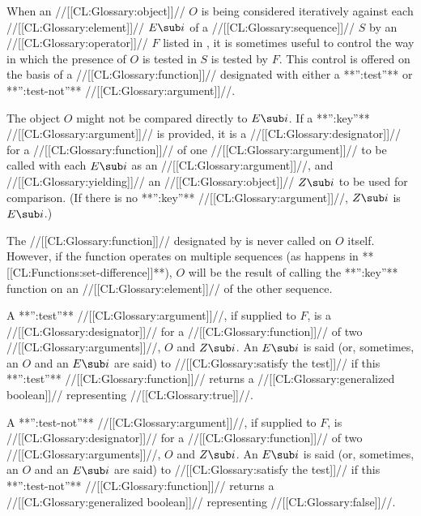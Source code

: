 

 

When an //[[CL:Glossary:object]]// $O$ is being considered iteratively  against each //[[CL:Glossary:element]]// $E\sub i$ of a //[[CL:Glossary:sequence]]// $S$ by an //[[CL:Glossary:operator]]// $F$ listed in \thenextfigure, it is sometimes useful to control the way in which the presence of $O$  is tested in $S$ is tested by $F$. This control is offered on the basis of a //[[CL:Glossary:function]]// designated with  either a **'':test''** or **'':test-not''** //[[CL:Glossary:argument]]//.


The object $O$ might not be compared directly to $E\sub i$. If a **'':key''** //[[CL:Glossary:argument]]// is provided, it is a //[[CL:Glossary:designator]]// for a //[[CL:Glossary:function]]// of one //[[CL:Glossary:argument]]//  to be called with each $E\sub i$ as an //[[CL:Glossary:argument]]//,  and //[[CL:Glossary:yielding]]// an //[[CL:Glossary:object]]// $Z\sub i$ to be used for comparison. (If there is no **'':key''** //[[CL:Glossary:argument]]//, $Z\sub i$ is $E\sub i$.)

The //[[CL:Glossary:function]]// designated by  is never called on $O$ itself. However, if the function operates on multiple sequences (\eg as happens in **[[CL:Functions:set-difference]]**), $O$ will be the result of calling the **'':key''** function on an //[[CL:Glossary:element]]// of the other sequence.  

A **'':test''** //[[CL:Glossary:argument]]//, if supplied to $F$, is a //[[CL:Glossary:designator]]// for a  //[[CL:Glossary:function]]// of two //[[CL:Glossary:arguments]]//, $O$ and $Z\sub i$. An $E\sub i$ is said (or, sometimes, an $O$ and an $E\sub i$ are said) to //[[CL:Glossary:satisfy the test]]//  if this **'':test''** //[[CL:Glossary:function]]// returns a //[[CL:Glossary:generalized boolean]]// representing  //[[CL:Glossary:true]]//.

A **'':test-not''** //[[CL:Glossary:argument]]//, if supplied to $F$,  is //[[CL:Glossary:designator]]// for a //[[CL:Glossary:function]]//  of two //[[CL:Glossary:arguments]]//, $O$ and $Z\sub i$. An $E\sub i$ is said (or, sometimes, an $O$ and an $E\sub i$ are said) to //[[CL:Glossary:satisfy the test]]//  if this **'':test-not''** //[[CL:Glossary:function]]// returns a //[[CL:Glossary:generalized boolean]]// representing //[[CL:Glossary:false]]//.

